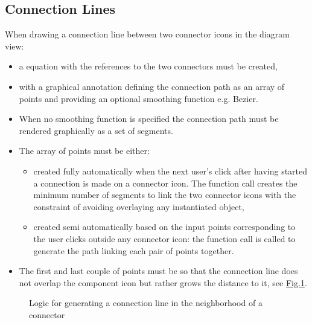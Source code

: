 \documentclass[letterpaper,10pt, openany,english]{sphinxmanual}
\begin{document}
\subsection{Connection Lines}
\label{\detokenize{requirements:connection-lines}}
When drawing a connection line between two connector icons in the diagram view:
\begin{itemize}
\item {} 
a  equation with the references to the two connectors must be created,

\item {} 
with a graphical annotation defining the connection path as an array of points and providing an optional smoothing function e.g. Bezier.

\item {} 
When no smoothing function is specified the connection path must be rendered graphically as a set of segments.

\item {} 
The array of points must be either:
\begin{itemize}
\item {} 
created fully automatically when the next user’s click after having started a connection is made on a connector icon. The function call  creates the minimum number of  segments to link the two connector icons with the constraint of avoiding overlaying any instantiated object,

\item {} 
created semi automatically based on the input points corresponding to the user clicks outside any connector icon: the function call  is called to generate the path linking each pair of points together.

\end{itemize}

\item {} 
The first and last couple of points must be so that the connection line does not overlap the component icon but rather grows the distance to it, see \hyperref[\detokenize{requirements:linkage-connect-distance}]{Fig.\@ \ref{\detokenize{requirements:linkage-connect-distance}}}.

\end{itemize}

\begin{figure}[htbp]
\centering
\capstart

\noindent{}
\caption{Logic for generating a connection line in the neighborhood of a connector}\label{\detokenize{requirements:linkage-connect-distance}}\end{figure}
\end{document}

